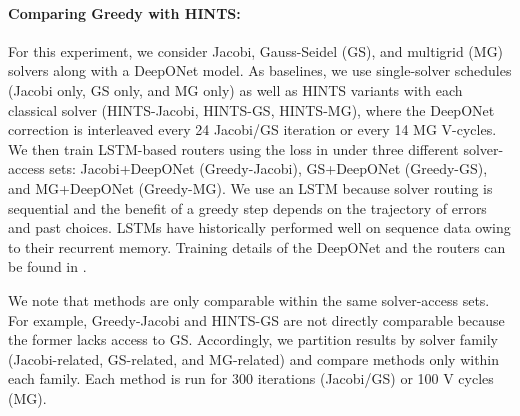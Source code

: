 \documentclass{article} %
\begin{document}
\paragraph{Comparing Greedy with HINTS:} For this experiment, we consider Jacobi, Gauss-Seidel (GS), and multigrid (MG) solvers along with a DeepONet model. As baselines, we use single-solver schedules (Jacobi only, GS only, and MG only) as well as HINTS variants with each classical solver (HINTS-Jacobi, HINTS-GS, HINTS-MG), where the DeepONet correction is interleaved every 24 Jacobi/GS iteration or every 14 MG V-cycles. We then train LSTM-based routers using the loss in  under three different solver-access sets: Jacobi+DeepONet (Greedy-Jacobi), GS+DeepONet (Greedy-GS), 
and MG+DeepONet (Greedy-MG). We use an LSTM because solver routing is sequential and the benefit of a greedy step depends on the trajectory of errors and past choices. LSTMs have historically performed well on sequence data owing to their recurrent memory. Training details of the DeepONet and the routers can be found in .

We note that methods are only comparable within the same solver-access sets. For example, Greedy-Jacobi and HINTS-GS are not directly comparable because the former lacks access to GS. Accordingly, we partition results by solver family (Jacobi-related, GS-related, and MG-related) and compare methods only within each family. Each method is run for 300 iterations (Jacobi/GS) or 100 V cycles (MG).

\end{document}
